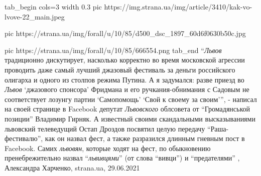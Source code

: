 \ifcmt
tab_begin cols=3
  width 0.3
  pic https://img.strana.ua/img/article/3410/kak-vo-lvove-22_main.jpeg

  pic https://strana.ua/img/forall/u/10/85/d500_dsc_1897_60d6f0630b50c.jpg

  pic https://strana.ua/img/forall/u/10/85/666554.png
tab_end
\fi
\enquote{\emph{Львов} традиционно дискутирует, насколько корректно во время московской
агрессии проводить даже самый лучший джазовый фестиваль за деньги российского
олигарха и одного из столпов режима Путина. А я задумался: разве приезд во
\emph{Львов} \enquote{джазового спонсора} Фридмана и его ручкания-обнимания с Садовым
не соответствует лозунгу партии \enquote{Самопомощь} \enquote{Свой к своему за
своим}}, - написал на своей странице в Facebook депутат \emph{Львовского} облсовета от
\enquote{Громадянськой позиции} Владимир Гирняк.  А известный своими
скандальными высказываниями львовский телеведущий Остап Дроздов посвятил целую
передачу \enquote{Раша-фестивалю}, как он назвал фест, а также разразился
длинным гневным пост в Facebook.  Самих \emph{львовян}, которые ходят на фест, по
обыкновению пренебрежительно назвал \enquote{\emph{львивцями}} (от слова
\enquote{вивци}) и \enquote{предателями}
, 
Александра Харченко, strana.ua, 29.06.2021

